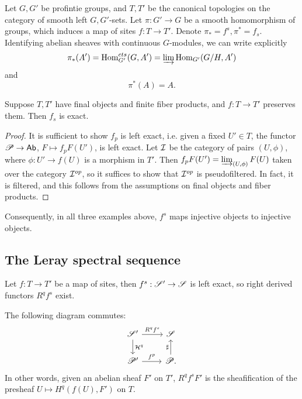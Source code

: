 \documentclass[11pt]{amsart}
\begin{document}
\begin{exm}
    Let $G,G'$ be profintie groups, and $T,T'$ be the canonical topologies on the category of smooth left $G,G'$-sets. Let $\pi: G'\to G$ be a smooth homomorphism of groups, which induces a map of sites $f:T\to T'$. Denote $\pi_\ast = f^s, \pi^\ast = f_s$. Identifying abelian sheaves with continuous $G$-modules, we can write explicitly
    \[\pi_\ast(A') = \operatorname{Hom}_{G'}^{cts}(G,A') = \varinjlim \operatorname{Hom}_{G'}(G/H, A')\]
    and
    \[\pi^\ast(A) = A.\]
\end{exm}


\begin{prop}
\label{fs_exact}
    Suppose $T,T'$ have final objects and finite fiber products, and $f:T\to T'$ preserves them. Then $f_s$ is exact.
\end{prop}

\begin{proof}
    It is sufficient to show $f_p$ is left exact, i.e. given a fixed $U'\in T$, the functor $\mathscr{P}\to \mathsf{Ab}$, $F\mapsto f_pF(U')$, is left exact. Let $\mathcal{I}$ be the category of pairs $(U, \phi)$, where $\phi:U'\to f(U)$ is a morphism in $T'$. Then $f_pF(U') = \varinjlim_{(U,\phi)} F(U)$ taken over the category $\mathcal{I}^{op}$, so it suffices to show that $\mathcal{I}^{op}$ is pseudofiltered. In fact, it is filtered, and this follows from the assumptions on final objects and fiber products.
\end{proof}

Consequently, in all three examples above, $f^s$ maps injective objects to injective objects.



\subsection{The Leray spectral sequence}


Let $f:T\to T'$ be a map of sites, then $f^s: \mathscr{S}'\to \mathscr{S}$ is left exact, so right derived functors $R^qf^s$ exist.


\begin{prop}
\label{1.22.1}
    The following diagram commutes:
    \[
    \begin{tikzcd}
        \sS' \arrow[r, "R^qf^s"] \arrow[d, "\cH^q"] & \sS \\
        \sP' \arrow[r, "f^p"] & \sP \arrow[u, "\sharp"].
    \end{tikzcd}
    \]
    In other words, given an abelian sheaf $F'$ on $T'$, $R^qf^sF'$ is the sheafification of the presheaf $U\mapsto H^q(f(U), F')$ on $T$.
\end{prop}
\end{document}
